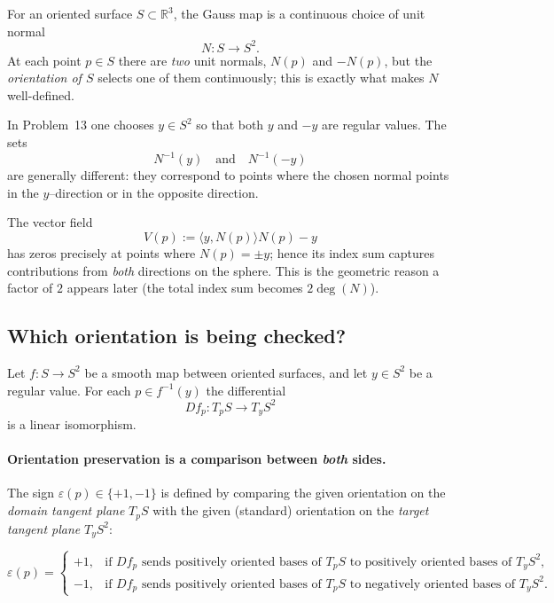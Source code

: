 \documentclass[12pt,a4paper]{article}
\theoremstyle{plain}
\theoremstyle{definition}      %
\begin{document}
	For an oriented surface $S\subset\mathbb R^3$, the Gauss map is a continuous choice
	of unit normal
	\[
	N\colon S\to S^2.
	\]
	At each point $p\in S$ there are \emph{two} unit normals, $N(p)$ and $-N(p)$,
	but the \emph{orientation of $S$} selects one of them continuously; this is exactly
	what makes $N$ well-defined.
	
	In Problem~13 one chooses $y\in S^2$ so that both $y$ and $-y$ are regular values.
	The sets
	\[
	N^{-1}(y)\quad\text{and}\quad N^{-1}(-y)
	\]
	are generally different: they correspond to points where the chosen normal points in
	the $y$--direction or in the opposite direction.
	
	The vector field
	\[
	V(p):=\langle y, N(p)\rangle N(p)-y
	\]
	has zeros precisely at points where $N(p)=\pm y$; hence its index sum captures contributions
	from \emph{both} directions on the sphere. This is the geometric reason a factor of $2$
	appears later (the total index sum becomes $2\deg(N)$).
	
	
	
	
	\subsection*{Which orientation is being checked?}
	
	Let $f\colon S\to S^{2}$ be a smooth map between oriented surfaces, and let
	$y\in S^{2}$ be a regular value. For each $p\in f^{-1}(y)$ the differential
	\[
	Df_p\colon T_pS \longrightarrow T_yS^{2}
	\]
	is a linear isomorphism.
	
	\paragraph{Orientation preservation is a comparison between \emph{both} sides.}
	The sign $\varepsilon(p)\in\{+1,-1\}$ is defined by comparing the given orientation
	on the \emph{domain tangent plane} $T_pS$ with the given (standard) orientation on the
	\emph{target tangent plane} $T_yS^{2}$:
	
	\[
	\varepsilon(p)=
	\begin{cases}
		+1, & \text{if } Df_p \text{ sends positively oriented bases of } T_pS \text{ to positively oriented bases of } T_yS^{2},\\[2pt]
		-1, & \text{if } Df_p \text{ sends positively oriented bases of } T_pS \text{ to negatively oriented bases of } T_yS^{2}.
	\end{cases}
	\]
	
\end{document}
